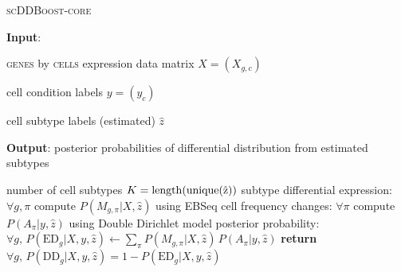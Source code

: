 \documentclass[11pt]{amsart}
\begin{document}
\begin{algorithm}
\caption{\textsc{scDDBoost-core}}\label{alg:scDDcore}
\raggedright\hspace*{\algorithmicindent} \textbf{Input}: \begin{list}{}{}
 \item \textsc{genes} by \textsc{cells} expression data matrix $X=(X_{g,c})$
 \item  cell condition labels $y=(y_c)$ 
 \item  cell subtype labels (estimated)  $\hat z$
 \end{list}
\hspace*{\algorithmicindent} 
\textbf{Output}:  posterior probabilities of differential distribution from estimated subtypes
\begin{algorithmic}[1]
 \item  number of cell subtypes $K = \rm{length}( \rm{unique}( \hat z ) )$  
\State subtype differential expression: $\forall g,\pi$ compute  $P(M_{g,\pi} | X, \hat z)$ using EBSeq\cite{ref:Leng}
\State cell frequency changes: $\forall \pi$ compute  $P(A_\pi | y, \hat z)$ using Double Dirichlet model 
\State posterior probability: $\forall g,  \, P(\text{ED}_g | X, y, \hat z)\gets \underset{\pi}{\sum}P(M_{g,\pi} | X, \hat z) \,
 P(A_\pi | y, \hat z)$
\State \textbf{return} $\forall g, \, P(\text{DD}_g |X, y, \hat z)=1-P(\text{ED}_g| X,y, \hat z)$
\EndProcedure
\end{algorithmic}
\end{algorithm}



\end{document}
